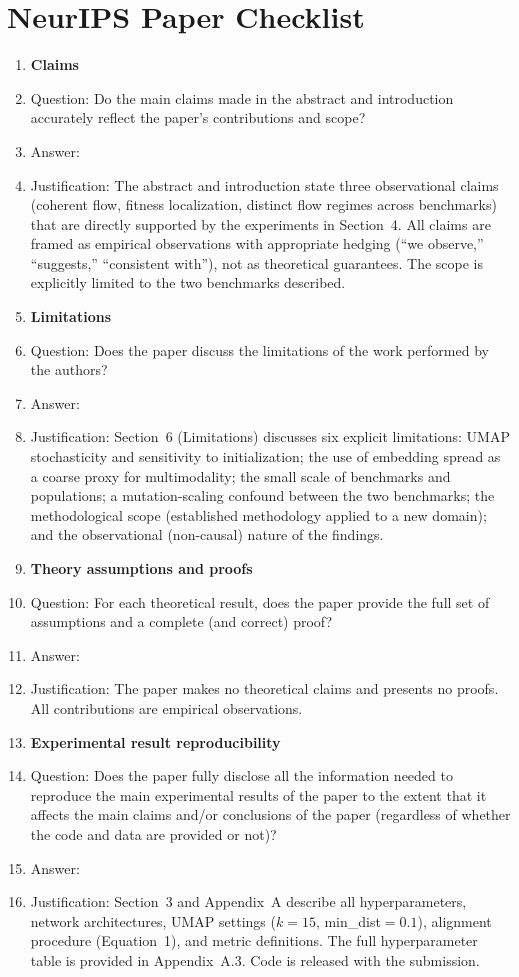 \section*{NeurIPS Paper Checklist}

\begin{enumerate}

\item {\bf Claims}
    \item[] Question: Do the main claims made in the abstract and introduction accurately reflect the paper's contributions and scope?
    \item[] Answer: \answerYes{}
    \item[] Justification: The abstract and introduction state three observational claims (coherent flow, fitness localization, distinct flow regimes across benchmarks) that are directly supported by the experiments in Section~4. All claims are framed as empirical observations with appropriate hedging (``we observe,'' ``suggests,'' ``consistent with''), not as theoretical guarantees. The scope is explicitly limited to the two benchmarks described.

\item {\bf Limitations}
    \item[] Question: Does the paper discuss the limitations of the work performed by the authors?
    \item[] Answer: \answerYes{}
    \item[] Justification: Section~6 (Limitations) discusses six explicit limitations: UMAP stochasticity and sensitivity to initialization; the use of embedding spread as a coarse proxy for multimodality; the small scale of benchmarks and populations; a mutation-scaling confound between the two benchmarks; the methodological scope (established methodology applied to a new domain); and the observational (non-causal) nature of the findings.

\item {\bf Theory assumptions and proofs}
    \item[] Question: For each theoretical result, does the paper provide the full set of assumptions and a complete (and correct) proof?
    \item[] Answer: \answerNA{}
    \item[] Justification: The paper makes no theoretical claims and presents no proofs. All contributions are empirical observations.

\item {\bf Experimental result reproducibility}
    \item[] Question: Does the paper fully disclose all the information needed to reproduce the main experimental results of the paper to the extent that it affects the main claims and/or conclusions of the paper (regardless of whether the code and data are provided or not)?
    \item[] Answer: \answerYes{}
    \item[] Justification: Section~3 and Appendix~A describe all hyperparameters, network architectures, UMAP settings ($k=15$, min\_dist$=0.1$), alignment procedure (Equation~1), and metric definitions. The full hyperparameter table is provided in Appendix~A.3. Code is released with the submission.


\end{enumerate}
